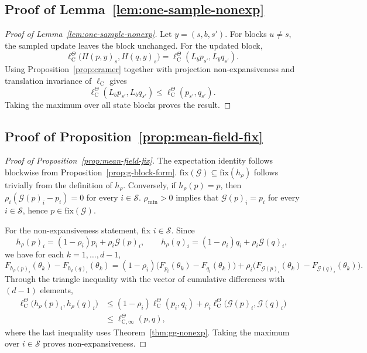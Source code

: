 \documentclass{article}
\newcommand{\X}{\mathcal{S}}
\begin{document}
\subsection{Proof of Lemma~\ref{lem:one-sample-nonexp}}
\begin{proof}[Proof of Lemma~\ref{lem:one-sample-nonexp}]
Let $y=(s,b,s')$. For blocks $u \ne s$, the sampled update leaves the block unchanged. For the updated block,
\begin{equation}
\ell^\Theta_\mathrm C\bigl(H(p, y)_s, H(q, y)_s\bigr) = \ell^\Theta_\mathrm C(L_b p_{s'}, L_b q_{s'}).
\end{equation}
Using Proposition~\ref{prop:cramer} together with projection non-expansiveness and translation invariance of $\ell_\mathrm C$ gives
\begin{equation}
\ell^\Theta_\mathrm C(L_b p_{s'}, L_b q_{s'}) \le \ell^\Theta_\mathrm C(p_{s'}, q_{s'}).
\end{equation}
Taking the maximum over all state blocks proves the result.
\end{proof}

\subsection{Proof of Proposition~\ref{prop:mean-field-fix}}
\begin{proof}[Proof of Proposition~\ref{prop:mean-field-fix}]
The expectation identity follows blockwise from Proposition~\ref{prop:g-block-form}. $\mathrm{fix}(\mathcal G) \subseteq \mathrm{fix}(h_\rho)$ follows trivially from the definition of $h_\rho$. Conversely, if $h_\rho(p) = p$, then $\rho_i(\mathcal G(p)_i - p_i) = 0$ for every $i \in \X$. $\rho_{\min}>0$ implies that $\mathcal G(p)_i = p_i$ for every $i \in \X$, hence $p \in \mathrm{fix}(\mathcal G)$.

For the non-expansiveness statement, fix $i \in \X$. Since
\begin{equation}
h_\rho(p)_i = (1-\rho_i)p_i + \rho_i\mathcal G(p)_i,\qquad h_\rho(q)_i = (1-\rho_i)q_i + \rho_i \mathcal G(q)_i,
\end{equation}
we have for each $k = 1, \dots, d-1$,
\begin{equation}
F_{h_\rho(p)_i}(\theta_k) - F_{h_\rho(q)_i}(\theta_k) = (1 - \rho_i)\bigl(F_{p_i}(\theta_k) -F_{q_i}(\theta_k)\bigr) + \rho_i \bigl(F_{\mathcal G(p)_i}(\theta_k) -  F_{\mathcal G(q)_i}(\theta_k)\bigr).
\end{equation}
Through the triangle inequality with the vector of cumulative differences with $(d-1)$ elements,
\begin{equation}
\begin{aligned}
\ell^\Theta_\mathrm C\bigl(h_\rho(p)_i, h_\rho(q)_i \bigr) &\le (1-\rho_i) \ell^\Theta_\mathrm C(p_i, q_i) + \rho_i \ell^\Theta_\mathrm C\bigl(\mathcal G(p)_i, \mathcal G(q) _i\bigr) \\
&\le \ell^\Theta_{\mathrm C, \infty}(p, q),
\end{aligned}
\end{equation}
where the last inequality uses Theorem~\ref{thm:gg-nonexp}. Taking the maximum over $i \in \X$ proves non-expansiveness.
\end{proof}
\end{document}
